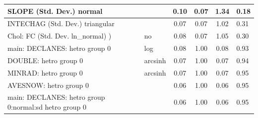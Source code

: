 \begin{table}
\begin{center}
\begin{tabular}{|l|l|c|c|c|l|}
			\hline
			SLOPE (Std. Dev.) normal &  & 0.10 & 0.07 & 1.34 & 0.18 \\
			\hline
			INTECHAG (Std. Dev.) triangular &  & 0.07 & 0.07 & 1.02 & 0.31 \\
			\hline
			 Chol: FC (Std. Dev. ln_normal) ) & no & 0.08 & 0.07 & 1.05 & 0.30 \\
			\hline
			main: DECLANES: hetro group 0 & log & 0.08 & 1.00 & 0.08 & 0.93 \\
			\hline
			DOUBLE: hetro group 0 & arcsinh & 0.07 & 1.00 & 0.07 & 0.94 \\
			\hline
			MINRAD: hetro group 0 & arcsinh & 0.07 & 1.00 & 0.07 & 0.95 \\
			\hline
			AVESNOW: hetro group 0 &  & 0.06 & 1.00 & 0.06 & 0.95 \\
			\hline
			main: DECLANES: hetro group 0:normal:sd  hetro group 0 &  & 0.06 & 1.00 & 0.06 & 0.95 \\
			\hline
		\end{tabular}
	\end{center}
\end{table}